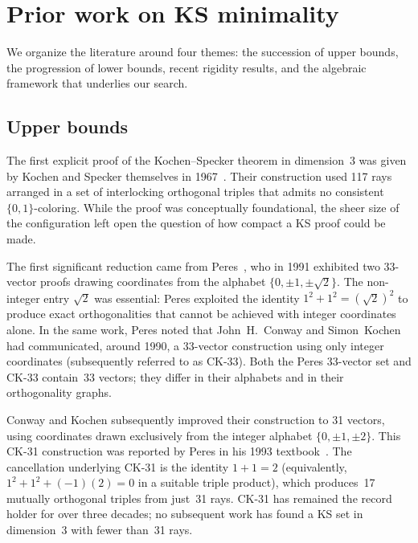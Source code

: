 \documentclass[twocolumn,pra,superscriptaddress,nofootinbib]{revtex4-2}
\begin{document}
\section{Prior work on KS minimality}
\label{sec:prior}

We organize the literature around four themes: the succession of upper bounds,
the progression of lower bounds, recent rigidity results, and the algebraic
framework that underlies our search.

\subsection{Upper bounds}
\label{sec:prior:upper}

The first explicit proof of the Kochen--Specker theorem in dimension~3 was given
by Kochen and Specker themselves in 1967~\cite{KochenSpecker1967}.  Their
construction used 117 rays arranged in a set of interlocking orthogonal triples
that admits no consistent $\{0,1\}$-coloring.  While the proof was conceptually
foundational, the sheer size of the configuration left open the question of how
compact a KS proof could be made.

The first significant reduction came from Peres~\cite{Peres1991}, who in 1991
exhibited two 33-vector proofs drawing coordinates from the alphabet
$\{0, \pm 1, \pm\sqrt{2}\}$.  The non-integer entry $\sqrt{2}$ was essential:
Peres exploited the identity $1^2 + 1^2 = (\sqrt{2})^2$ to produce exact
orthogonalities that cannot be achieved with integer coordinates alone.
In the same work, Peres noted that John~H.~Conway and Simon~Kochen had
communicated, around 1990, a 33-vector construction using only integer
coordinates (subsequently referred to as CK-33).  Both the Peres 33-vector
set and CK-33 contain~33 vectors; they differ in their alphabets and in
their orthogonality graphs.

Conway and Kochen subsequently improved their construction to 31 vectors, using
coordinates drawn exclusively from the integer alphabet $\{0, \pm 1, \pm 2\}$.
This CK-31 construction was reported by Peres in his 1993
textbook~\cite{Peres1993,ConwayKochen}.  The cancellation underlying CK-31 is
the identity $1 + 1 = 2$ (equivalently, $1^2 + 1^2 + (-1)(2) = 0$ in a suitable
triple product), which produces~17 mutually orthogonal triples from just~31 rays.
CK-31 has remained the record holder for over three decades; no subsequent work
has found a KS set in dimension~3 with fewer than~31 rays.
\end{document}
